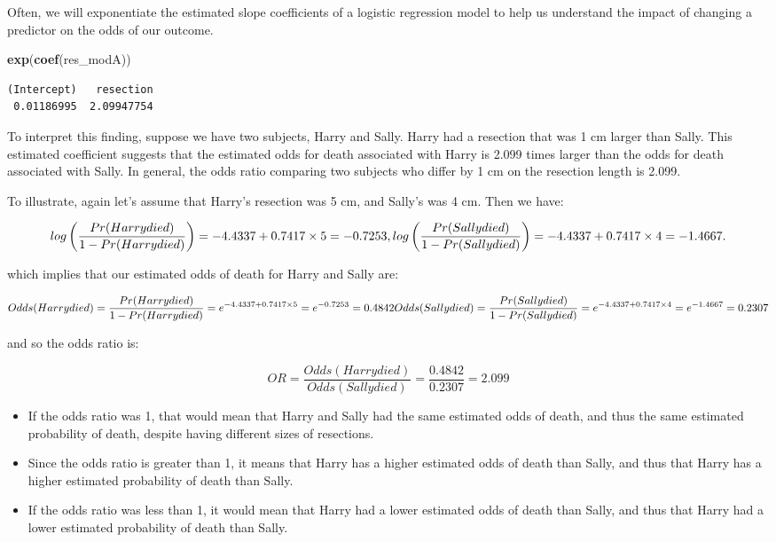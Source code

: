 \documentclass[]{book}
\newenvironment{Shaded}{\begin{snugshade}}{\end{snugshade}}
\newcommand{\KeywordTok}[1]{\textcolor[rgb]{0.13,0.29,0.53}{\textbf{#1}}}
\newcommand{\NormalTok}[1]{#1}
\providecommand{\tightlist}{%
  \setlength{\itemsep}{0pt}\setlength{\parskip}{0pt}}
\theoremstyle{definition}
\theoremstyle{definition}
\theoremstyle{definition}
\theoremstyle{remark}
\begin{document}
Often, we will exponentiate the estimated slope coefficients of a
logistic regression model to help us understand the impact of changing a
predictor on the odds of our outcome.

\begin{Shaded}
\begin{Highlighting}[]
\KeywordTok{exp}\NormalTok{(}\KeywordTok{coef}\NormalTok{(res_modA))}
\end{Highlighting}
\end{Shaded}

\begin{verbatim}
(Intercept)   resection 
 0.01186995  2.09947754 
\end{verbatim}

To interpret this finding, suppose we have two subjects, Harry and
Sally. Harry had a resection that was 1 cm larger than Sally. This
estimated coefficient suggests that the estimated odds for death
associated with Harry is 2.099 times larger than the odds for death
associated with Sally. In general, the odds ratio comparing two subjects
who differ by 1 cm on the resection length is 2.099.

To illustrate, again let's assume that Harry's resection was 5 cm, and
Sally's was 4 cm. Then we have:

\[
log\left(\frac{Pr(Harry died)}{1 - Pr(Harry died)}\right) = -4.4337 + 0.7417 \times 5 = -0.7253, \\
log\left(\frac{Pr(Sally died)}{1 - Pr(Sally died)}\right) = -4.4337 + 0.7417 \times 4 = -1.4667.
\]

which implies that our estimated odds of death for Harry and Sally are:

\[
Odds(Harry died) = \frac{Pr(Harry died)}{1 - Pr(Harry died)} = e^{-4.4337 + 0.7417 \times 5} = e^{-0.7253} = 0.4842 \\
Odds(Sally died) = \frac{Pr(Sally died)}{1 - Pr(Sally died)} = e^{-4.4337 + 0.7417 \times 4} = e^{-1.4667} = 0.2307
\]

and so the odds ratio is:

\[
OR = \frac{Odds(Harry died)}{Odds(Sally died)} = \frac{0.4842}{0.2307} = 2.099
\]

\begin{itemize}
\tightlist
\item
  If the odds ratio was 1, that would mean that Harry and Sally had the
  same estimated odds of death, and thus the same estimated probability
  of death, despite having different sizes of resections.
\item
  Since the odds ratio is greater than 1, it means that Harry has a
  higher estimated odds of death than Sally, and thus that Harry has a
  higher estimated probability of death than Sally.
\item
  If the odds ratio was less than 1, it would mean that Harry had a
  lower estimated odds of death than Sally, and thus that Harry had a
  lower estimated probability of death than Sally.
\end{itemize}
\end{document}
